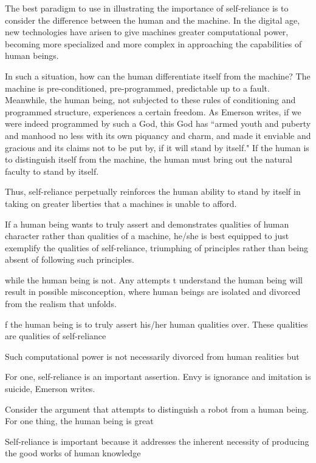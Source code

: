 \documentclass[12pt,letterpaper]{article}
\newif\ifdraft
\begin{document}
The best paradigm to use in illustrating the importance of self-reliance is to consider the difference between the human and the machine.  In the digital age, new technologies have arisen to give machines greater computational power, becoming more specialized and more complex in approaching the capabilities of human beings.

In such a situation, how can the human differentiate itself from the machine?
The machine is pre-conditioned, pre-programmed, predictable up to a fault.  Meanwhile, the human being, not subjected to these rules of conditioning and programmed structure, experiences a certain freedom.  As Emerson writes, if we were indeed programmed by such a God, this God has ``armed youth and puberty and manhood no less with its own piquancy and charm, and made it enviable and gracious and its claims not to be put by, if it will stand by itself."  If the human is to distinguish itself from the machine, the human must bring out the natural faculty to stand by itself.

Thus, self-reliance perpetually reinforces the human ability
to stand by itself in taking on greater liberties that a
machines is unable to afford.

If a human being wants to truly assert and demonstrates qualities of human character rather than qualities of a machine, he/she is best equipped to just exemplify the qualities of self-reliance, triumphing of principles rather than being absent of following such principles.  


\ifdraft

while the human being is not.  Any attempts t understand the human being will result in possible misconception, where human beings are isolated and divorced from the realism that unfolds.

f the human being is to truly assert his/her human qualities over.  These qualities are qualities of self-reliance

Such computational power is not necessarily divorced from human realities but

For one, self-reliance is an important assertion.  Envy is ignorance and imitation is suicide, Emerson writes.  

Consider the argument that attempts to distinguish a robot from a human being.  For one thing, the human being is great

Self-reliance is important because it addresses the inherent necessity of producing the good works of human knowledge  
\end{document}
